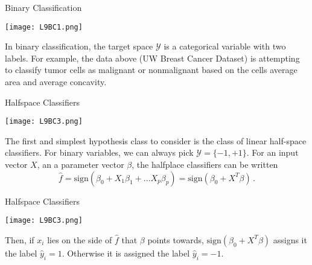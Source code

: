 \documentclass[10pt, table, dvipsnames,xcdraw, handout]{beamer}
\begin{document}
\begin{frame}[fragile]{Binary Classification}
  \begin{minipage}[t][0.5\textheight][t]{\textwidth}
	\centering \texttt{[image: L9BC1.png]} 
  \end{minipage}
  \vfill
\begin{minipage}[t][0.5\textheight][t]{\textwidth}
In binary classification, the target space $\mathcal{Y}$ is a categorical variable with two labels. \pause For example, the data above (UW Breast Cancer Dataset) is attempting to classify tumor cells as malignant or nonmalignant based on the cells average area and average concavity. 

\end{minipage}
\end{frame}





\begin{frame}[fragile]{Halfspace Classifiers}
  \begin{minipage}[t][0.5\textheight][t]{\textwidth}
	\centering \texttt{[image: L9BC3.png]} 
  \end{minipage}
  \vfill
\begin{minipage}[t][0.5\textheight][t]{\textwidth}
The first and simplest hypothesis class to consider is the class of linear half-space classifiers. For binary variables, we can always pick $\mathcal{Y} = \{-1,+1\}$. For an input vector $X$, an a parameter vector $\beta$, the halfplace classifiers can be written
$$
\hat f = \text{sign}(\beta_0 + X_1\beta_1+\ldots X_p\beta_p) =  \text{sign}(\beta_0 + X^T\beta)\,. 
$$
\end{minipage}
\end{frame}




\begin{frame}[fragile]{Halfspace Classifiers}
  \begin{minipage}[t][0.5\textheight][t]{\textwidth}
	\centering \texttt{[image: L9BC3.png]} 
  \end{minipage}
  \vfill
\begin{minipage}[t][0.5\textheight][t]{\textwidth}
Then, if $x_i$ lies on the side of $\hat f$ that $\beta$ points towards, $\text{sign}(\beta_0 + X^T\beta)$ assigns it the label $\hat y_i = 1$. Otherwise it is assigned the label $\hat y_i = -1$. 
\end{minipage}
\end{frame}
\end{document}
